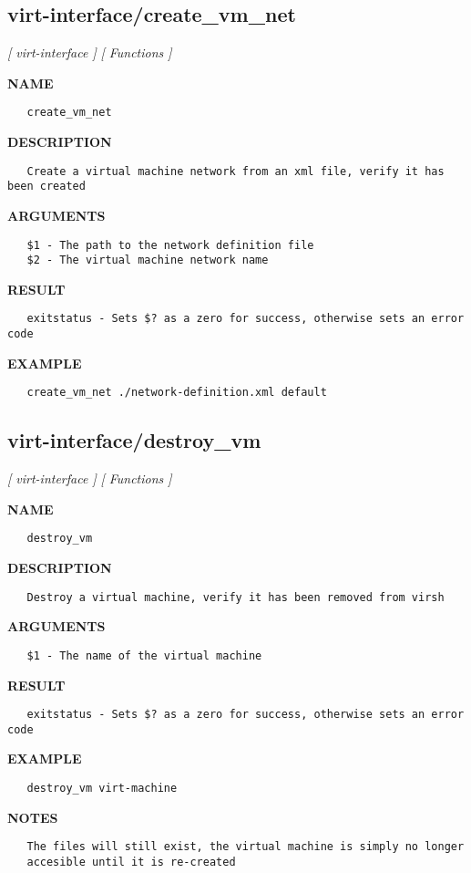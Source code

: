 \subsection{virt-interface/create\_vm\_net}
\textsl{[ virt-interface ]}
\textsl{[ Functions ]}

\label{ch:robo62}
\label{ch:virt_interface_create_vm_net}
\textbf{NAME}
\begin{verbatim}
   create_vm_net
\end{verbatim}
\textbf{DESCRIPTION}
\begin{verbatim}
   Create a virtual machine network from an xml file, verify it has been created 
\end{verbatim}
\textbf{ARGUMENTS}
\begin{verbatim}
   $1 - The path to the network definition file
   $2 - The virtual machine network name
\end{verbatim}
\textbf{RESULT}
\begin{verbatim}
   exitstatus - Sets $? as a zero for success, otherwise sets an error code
\end{verbatim}
\textbf{EXAMPLE}
\begin{verbatim}
   create_vm_net ./network-definition.xml default
\end{verbatim}
\newpage
\subsection{virt-interface/destroy\_vm}
\textsl{[ virt-interface ]}
\textsl{[ Functions ]}

\label{ch:robo63}
\label{ch:virt_interface_destroy_vm}
\textbf{NAME}
\begin{verbatim}
   destroy_vm
\end{verbatim}
\textbf{DESCRIPTION}
\begin{verbatim}
   Destroy a virtual machine, verify it has been removed from virsh
\end{verbatim}
\textbf{ARGUMENTS}
\begin{verbatim}
   $1 - The name of the virtual machine
\end{verbatim}
\textbf{RESULT}
\begin{verbatim}
   exitstatus - Sets $? as a zero for success, otherwise sets an error code
\end{verbatim}
\textbf{EXAMPLE}
\begin{verbatim}
   destroy_vm virt-machine
\end{verbatim}
\textbf{NOTES}
\begin{verbatim}
   The files will still exist, the virtual machine is simply no longer 
   accesible until it is re-created 
\end{verbatim}
\newpage
